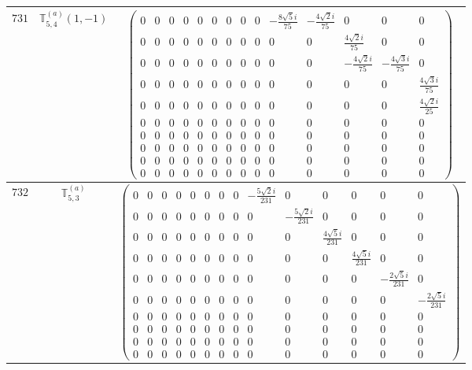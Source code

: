 \documentclass[fleqn,8pt,landscape]{jsarticle}
\begin{document}
\begin{center}
\begin{longtable}{ccc}
$ 731 $ & $ \mathbb{T}_{5,4}^{(a)}(1,-1) $ & $ \begin{pmatrix} 0 & 0 & 0 & 0 & 0 & 0 & 0 & 0 & 0 & - \frac{8 \sqrt{5} i}{75} & - \frac{4 \sqrt{2} i}{75} & 0 & 0 & 0 \\ 0 & 0 & 0 & 0 & 0 & 0 & 0 & 0 & 0 & 0 & 0 & \frac{4 \sqrt{2} i}{75} & 0 & 0 \\ 0 & 0 & 0 & 0 & 0 & 0 & 0 & 0 & 0 & 0 & 0 & - \frac{4 \sqrt{2} i}{75} & - \frac{4 \sqrt{3} i}{75} & 0 \\ 0 & 0 & 0 & 0 & 0 & 0 & 0 & 0 & 0 & 0 & 0 & 0 & 0 & \frac{4 \sqrt{3} i}{75} \\ 0 & 0 & 0 & 0 & 0 & 0 & 0 & 0 & 0 & 0 & 0 & 0 & 0 & \frac{4 \sqrt{2} i}{25} \\ 0 & 0 & 0 & 0 & 0 & 0 & 0 & 0 & 0 & 0 & 0 & 0 & 0 & 0 \\ 0 & 0 & 0 & 0 & 0 & 0 & 0 & 0 & 0 & 0 & 0 & 0 & 0 & 0 \\ 0 & 0 & 0 & 0 & 0 & 0 & 0 & 0 & 0 & 0 & 0 & 0 & 0 & 0 \\ 0 & 0 & 0 & 0 & 0 & 0 & 0 & 0 & 0 & 0 & 0 & 0 & 0 & 0 \\ 0 & 0 & 0 & 0 & 0 & 0 & 0 & 0 & 0 & 0 & 0 & 0 & 0 & 0 \end{pmatrix} $ \\ \hline
$ 732 $ & $ \mathbb{T}_{5,3}^{(a)} $ & $ \begin{pmatrix} 0 & 0 & 0 & 0 & 0 & 0 & 0 & 0 & - \frac{5 \sqrt{2} i}{231} & 0 & 0 & 0 & 0 & 0 \\ 0 & 0 & 0 & 0 & 0 & 0 & 0 & 0 & 0 & - \frac{5 \sqrt{2} i}{231} & 0 & 0 & 0 & 0 \\ 0 & 0 & 0 & 0 & 0 & 0 & 0 & 0 & 0 & 0 & \frac{4 \sqrt{5} i}{231} & 0 & 0 & 0 \\ 0 & 0 & 0 & 0 & 0 & 0 & 0 & 0 & 0 & 0 & 0 & \frac{4 \sqrt{5} i}{231} & 0 & 0 \\ 0 & 0 & 0 & 0 & 0 & 0 & 0 & 0 & 0 & 0 & 0 & 0 & - \frac{2 \sqrt{5} i}{231} & 0 \\ 0 & 0 & 0 & 0 & 0 & 0 & 0 & 0 & 0 & 0 & 0 & 0 & 0 & - \frac{2 \sqrt{5} i}{231} \\ 0 & 0 & 0 & 0 & 0 & 0 & 0 & 0 & 0 & 0 & 0 & 0 & 0 & 0 \\ 0 & 0 & 0 & 0 & 0 & 0 & 0 & 0 & 0 & 0 & 0 & 0 & 0 & 0 \\ 0 & 0 & 0 & 0 & 0 & 0 & 0 & 0 & 0 & 0 & 0 & 0 & 0 & 0 \\ 0 & 0 & 0 & 0 & 0 & 0 & 0 & 0 & 0 & 0 & 0 & 0 & 0 & 0 \end{pmatrix} $ \\ \hline

\end{longtable}
\end{center}
\end{document}
